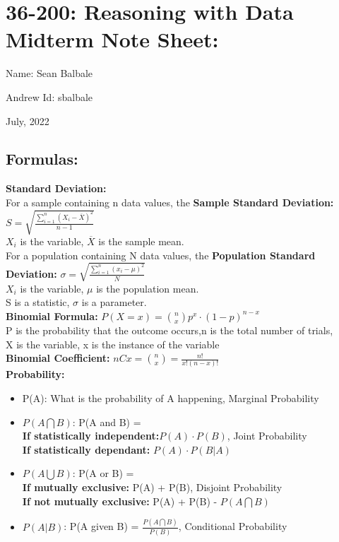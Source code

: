 \documentclass{article}
\author{Sean Balbale}
\date{July 2022}
\begin{document}
\section*{36-200: Reasoning with Data Midterm Note Sheet:}
\begin{enumerate*}[label={}]
    \item Name: Sean Balbale
    \item Andrew Id: sbalbale
    \item July, 2022
\end{enumerate*}
\subsection*{Formulas:}
\textbf{Standard Deviation:}
\\For a sample containing n data values, the \textbf{Sample Standard Deviation:}
$S = \sqrt{\frac{\sum_{i=1}^{n} (X_{i} - \overline{X})^2}{n-1}}$
\\$X_{i}$ is the variable, $\overline{X}$ is the sample mean.
\\For a population containing N data values, the \textbf{Population Standard Deviation:}
$\sigma = \sqrt{\frac{\sum_{i=1}^{n} (x_{i} - {\mu})^2}{N}}$
\\$X_{i}$ is the variable, $\mu$ is the population mean.
\\S is a statistic, $\sigma$ is a parameter.
\\\textbf{Binomial Formula:} 
$P(X = x) = {n \choose x} p^x \cdot (1-p)^{n-x}$
\\P is the probability that the outcome occurs,n is the total number of trials,
\\X is the variable, x is the instance of the variable
\\\textbf{Binomial Coefficient:} $nCx = {n \choose x} = \frac{n!}{x!(n-x)!}$
\\\textbf{Probability:}
\begin{itemize}
    \item P(A): What is the probability of A happening, Marginal Probability
    \item $P(A \bigcap B)$: P(A and B) = 
    \\\textbf{If statistically independent:}$P(A) \cdot P(B)$, Joint Probability
    \\\textbf{If statistically dependant:} $P(A) \cdot P(B|A)$
    \item $P(A \bigcup B)$: P(A or B) = 
    \\\textbf{If mutually exclusive:} P(A) + P(B), Disjoint Probability
    \\\textbf{If not mutually exclusive:} P(A) + P(B) - $P(A \bigcap B)$
    \item $P(A|B)$: P(A given B) = $\frac{P(A \bigcap B)}{P(B)}$, Conditional Probability
\end{itemize}
\end{document}

